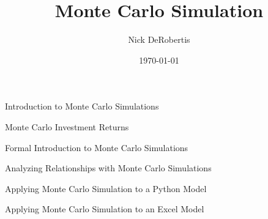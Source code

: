 \documentclass[]{article}
\begin{document}
\title{Monte Carlo Simulation}
\author{Nick DeRobertis}
\date{\today}
\maketitle
\begin{section}{Introduction to Monte Carlo Simulations}

\end{section}
\begin{section}{Monte Carlo Investment Returns}

\end{section}
\begin{section}{Formal Introduction to Monte Carlo Simulations}

\end{section}
\begin{section}{Analyzing Relationships with Monte Carlo Simulations}

\end{section}
\begin{section}{Applying Monte Carlo Simulation to a Python Model}

\end{section}
\begin{section}{Applying Monte Carlo Simulation to an Excel Model}

\end{section}
\end{document}
